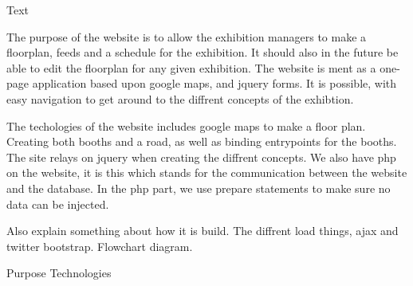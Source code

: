 Text

The purpose of the website is to allow the exhibition managers to make a floorplan, feeds and a schedule for the exhibition.
It should also in the future be able to edit the floorplan for any given exhibition.
The website is ment as a one-page application based upon google maps, and jquery forms.
It is possible, with easy navigation to get around to the diffrent concepts of the exhibtion.

The techologies of the website includes google maps to make a floor plan. Creating both booths and a road, as well as binding entrypoints for the booths. The site relays on jquery when creating the diffrent concepts.
We also have php on the website, it is this which stands for the communication between the website and the database.
In the php part, we use prepare statements to make sure no data can be injected.

Also explain something about how it is build. The diffrent load things, ajax and twitter bootstrap. Flowchart diagram.




Purpose
Technologies

